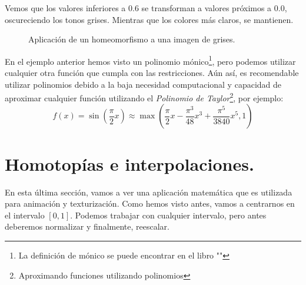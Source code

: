 Vemos que los valores inferiores a \(0.6\) se transforman a valores próximos a \(0.0\), oscureciendo los tonos grises. Mientras que los colores más claros, se mantienen.
\begin{figure}[H]
  \centering
  \captionsetup{justification=centering}%
  \hfill
  \caption{Aplicación de un homeomorfismo a una imagen de grises.}
\end{figure}
En el ejemplo anterior hemos visto un polinomio mónico\footnote{La definición de mónico se puede encontrar en el libro ""}, pero podemos utilizar cualquier otra función que cumpla con las restricciones. Aún así, es recomendable utilizar polinomios debido a la baja necesidad computacional y capacidad de aproximar cualquier función utilizando el \textit{Polinomio de Taylor}\footnote{Aproximando funciones utilizando polinomios}, por ejemplo:
\[ f(x)=\sin\left(\dfrac{\pi}{2}x\right)\approx \max\left(\dfrac{\pi}{2}x-\dfrac{\pi^3}{48}x^3+\dfrac{\pi^5}{3840}x^5, 1\right) \]

\section{Homotopías e interpolaciones.}
En esta última sección, vamos a ver una aplicación matemática que es utilizada para animación y texturización.
Como hemos visto antes, vamos a centrarnos en el intervalo \([0, 1]\). Podemos trabajar con cualquier intervalo, pero antes deberemos normalizar y finalmente, reescalar.

